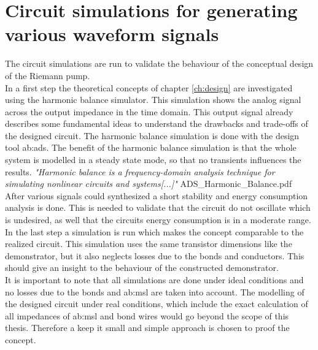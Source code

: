 \chapter{Circuit simulations for generating various waveform signals}
The circuit simulations are run to validate the behaviour of the conceptual design of the Riemann pump.\\
In a first step the theoretical concepts of chapter \ref{ch:design} are investigated using the harmonic balance simulator.
This simulation shows the analog signal across the output impedance in the time domain. 
This output signal already describes some fundamental ideas to understand the drawbacks and trade-offs of the designed circuit.
The harmonic balance simulation is done with the design tool \gls{ab:ads}.
The benefit of the harmonic balance simulation is that the whole system is modelled in a steady state mode, so that no transients influences the results. \textit{"Harmonic balance is a frequency-domain analysis technique for simulating nonlinear circuits and systems[...]"}  ADS\_Harmonic\_Balance.pdf\\
    After various signals could synthesized a short stability and energy consumption analysis is done. This is needed to validate that the circuit do not oscillate which is undesired, as well that the circuits energy consumption is in a moderate range. \\
    In the last step a simulation is run which makes the concept comparable to the realized circuit. 
    This simulation uses the same transistor dimensions like the demonstrator, but it also neglects losses due to the bonds and conductors. This should give an insight to the behaviour of the constructed demonstrator.\\
   It is important to note that all simulations are done under ideal conditions and no losses due to the bonds and \gls{ab:msl} are taken into account. 
    The modelling of the designed circuit under real conditions, which include the exact calculation of all impedances of \gls{ab:msl} and bond wires would go beyond the scope of this thesis. Therefore a keep it small and simple approach is chosen to proof the concept.\\   

